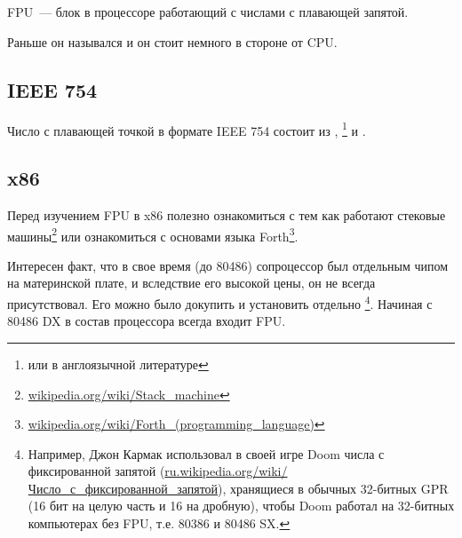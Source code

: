 \section{\FPUChapterName}
\label{sec:FPU}

\newcommand{\FNURLSTACK}{\footnote{\href{http://go.yurichev.com/17123}{wikipedia.org/wiki/Stack\_machine}}}
\newcommand{\FNURLFORTH}{\footnote{\href{http://go.yurichev.com/17124}{wikipedia.org/wiki/Forth\_(programming\_language)}}}
\newcommand{\FNURLIEEE}{\footnote{\href{http://go.yurichev.com/17125}{wikipedia.org/wiki/IEEE\_floating\_point}}}
\newcommand{\FNURLSP}{\footnote{\href{http://go.yurichev.com/17126}{wikipedia.org/wiki/Single-precision\_floating-point\_format}}}
\newcommand{\FNURLDP}{\footnote{\href{http://go.yurichev.com/17127}{wikipedia.org/wiki/Double-precision\_floating-point\_format}}}
\newcommand{\FNURLEP}{\footnote{\href{http://go.yurichev.com/17128}{wikipedia.org/wiki/Extended\_precision}}}

\ac{FPU}~--- блок в процессоре работающий с числами с плавающей запятой.

Раньше он назывался  и он стоит немного в стороне от \ac{CPU}.

\subsection{IEEE 754}

Число с плавающей точкой в формате IEEE 754 состоит из , \footnote{ или  
в англоязычной литературе} и .

\subsection{x86}

Перед изучением \ac{FPU} в x86 полезно ознакомиться с тем как работают стековые машины\FNURLSTACK 
или ознакомиться с основами языка Forth\FNURLFORTH.

Интересен факт, что в свое время (до 80486) сопроцессор был отдельным чипом на материнской плате, 
и вследствие его высокой цены, он не всегда присутствовал. Его можно было докупить и установить отдельно
\footnote{Например, Джон Кармак использовал в своей игре Doom числа с фиксированной запятой 
(\href{http://go.yurichev.com/17357}{ru.wikipedia.org/wiki/Число\_с\_фиксированной\_запятой}), хранящиеся
в обычных 32-битных \ac{GPR} (16 бит на целую часть и 16 на дробную),
чтобы Doom работал на 32-битных компьютерах без FPU, т.е. 80386 и 80486 SX.}.
Начиная с 80486 DX в состав процессора всегда входит FPU.

